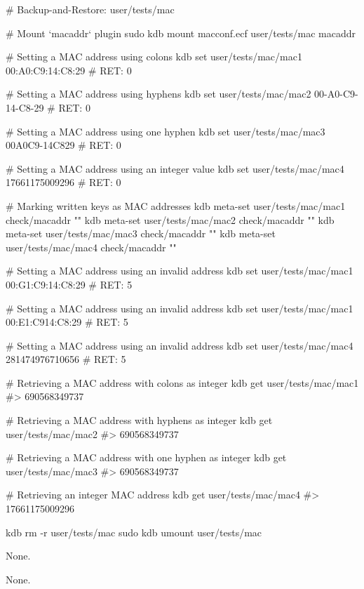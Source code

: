 \begin{DoxyCode}
# Backup-and-Restore: user/tests/mac

# Mount `macaddr` plugin
sudo kdb mount macconf.ecf user/tests/mac macaddr

# Setting a MAC address using colons
kdb set user/tests/mac/mac1 00:A0:C9:14:C8:29
# RET: 0

# Setting a MAC address using hyphens
kdb set user/tests/mac/mac2 00-A0-C9-14-C8-29
# RET: 0

# Setting a MAC address using one hyphen
kdb set user/tests/mac/mac3 00A0C9-14C829
# RET: 0

# Setting a MAC address using an integer value
kdb set user/tests/mac/mac4 17661175009296
# RET: 0

# Marking written keys as MAC addresses
kdb meta-set user/tests/mac/mac1 check/macaddr ""
kdb meta-set user/tests/mac/mac2 check/macaddr ""
kdb meta-set user/tests/mac/mac3 check/macaddr ""
kdb meta-set user/tests/mac/mac4 check/macaddr ""

# Setting a MAC address using an invalid address
kdb set user/tests/mac/mac1 00:G1:C9:14:C8:29
# RET: 5

# Setting a MAC address using an invalid address
kdb set user/tests/mac/mac1 00:E1:C914:C8:29
# RET: 5

# Setting a MAC address using an invalid address
kdb set user/tests/mac/mac4 281474976710656
# RET: 5

# Retrieving a MAC address with colons as integer
kdb get user/tests/mac/mac1
#> 690568349737

# Retrieving a MAC address with hyphens as integer
kdb get user/tests/mac/mac2
#> 690568349737

# Retrieving a MAC address with one hyphen as integer
kdb get user/tests/mac/mac3
#> 690568349737

# Retrieving an integer MAC address
kdb get user/tests/mac/mac4
#> 17661175009296

kdb rm -r user/tests/mac
sudo kdb umount user/tests/mac
\end{DoxyCode}


None.

None. 